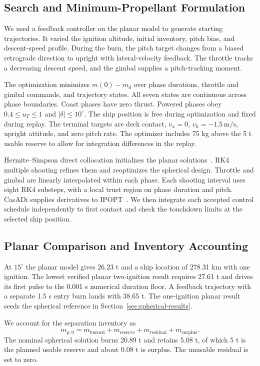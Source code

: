 \subsection{Search and Minimum-Propellant Formulation}
We used a feedback controller on the planar model to generate starting trajectories. It varied the ignition altitude, initial inventory, pitch bias, and descent-speed profile. During the burn, the pitch target changes from a biased retrograde direction to upright with lateral-velocity feedback. The throttle tracks a decreasing descent speed, and the gimbal supplies a pitch-tracking moment.

The optimization minimizes $m(0)-m_d$ over phase durations, throttle and gimbal commands, and trajectory states. All seven states are continuous across phase boundaries. Coast phases have zero thrust. Powered phases obey $0.4\leq u_T\leq1$ and $|\delta|\leq10^\circ$. The ship position is free during optimization and fixed during replay. The terminal targets are deck contact, $v_x=0$, $v_h=-1.5\,\mathrm{m/s}$, upright attitude, and zero pitch rate. The optimizer includes 75 kg above the 5 t usable reserve to allow for integration differences in the replay.

Hermite--Simpson direct collocation initializes the planar solutions~\cite{kelly}. RK4 multiple shooting refines them and reoptimizes the spherical design. Throttle and gimbal are linearly interpolated within each phase. Each shooting interval uses eight RK4 substeps, with a local trust region on phase duration and pitch. CasADi supplies derivatives to IPOPT~\cite{casadi,ipopt}. We then integrate each accepted control schedule independently to first contact and check the touchdown limits at the selected ship position.

\subsection{Planar Comparison and Inventory Accounting}
At $15^\circ$ the planar model gives 26.23 t and a ship location of 278.31 km with one ignition. The lowest verified planar two-ignition result requires 27.61 t and drives its first pulse to the 0.001 s numerical duration floor. A feedback trajectory with a separate 1.5 s entry burn lands with 38.65 t. The one-ignition planar result seeds the spherical reference in Section~\ref{sec:spherical-results}.

We account for the separation inventory as
\begin{equation}\label{eq:p2-propellant-budget}
 m_{p,0}=m_{\mathrm{burned}}+m_{\mathrm{reserve}}+m_{\mathrm{residual}}+m_{\mathrm{surplus}}.
\end{equation}
The nominal spherical solution burns 20.89 t and retains 5.08 t, of which 5 t is the planned usable reserve and about 0.08 t is surplus. The unusable residual is set to zero.
